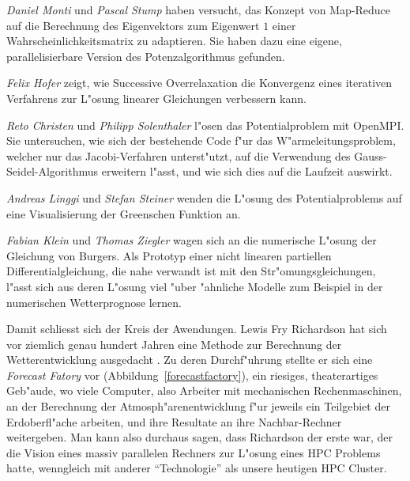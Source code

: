 \begin{refsection}
{\em Daniel Monti} und {\em Pascal Stump} haben versucht, das Konzept
von Map-Reduce auf die Berechnung des Eigenvektors zum Eigenwert $1$
einer Wahrscheinlichkeitsmatrix zu adaptieren. Sie haben dazu eine eigene,
parallelisierbare Version des Potenzalgorithmus gefunden.

{\em Felix Hofer} zeigt, wie Successive Overrelaxation die
Konvergenz eines iterativen Verfahrens zur L"osung linearer Gleichungen
verbessern kann.

{\em Reto Christen} und {\em Philipp Solenthaler} l"osen das Potentialproblem
mit OpenMPI. Sie untersuchen, wie sich der bestehende Code f"ur das
W"armeleitungsproblem, welcher nur das Jacobi-Verfahren unterst"utzt,
auf die Verwendung des Gauss-Seidel-Algorithmus erweitern l"asst, und
wie sich dies auf die Laufzeit auswirkt.

{\em Andreas Linggi} und {\em Stefan Steiner} wenden die L"osung des
Potentialproblems auf eine Visualisierung der Greenschen Funktion an.

{\em Fabian Klein} und {\em Thomas Ziegler} wagen sich an die numerische
L"osung der Gleichung von Burgers. Als Prototyp einer nicht linearen
partiellen Differentialgleichung, die nahe verwandt ist mit den
Str"omungsgleichungen, l"asst sich aus deren L"osung viel "uber "ahnliche
Modelle zum Beispiel in der numerischen Wetterprognose lernen.

Damit schliesst sich der Kreis der Awendungen. Lewis Fry Richardson hat
sich vor ziemlich genau hundert Jahren eine Methode zur Berechnung der
Wetterentwicklung ausgedacht \cite{skript:richardson}.
Zu deren Durchf"uhrung stellte er sich
eine {\em Forecast Fatory} vor (Abbildung~\ref{forecastfactory}),
ein riesiges, theaterartiges Geb"aude,
wo viele Computer, also Arbeiter mit mechanischen Rechenmaschinen, an der
Berechnung der Atmosph"arenentwicklung f"ur jeweils ein Teilgebiet
der Erdoberfl"ache arbeiten,
und ihre Resultate an ihre Nachbar-Rechner weitergeben. 
Man kann also durchaus sagen, dass Richardson der erste war, der die Vision
eines massiv parallelen Rechners zur L"osung eines HPC Problems hatte,
wenngleich mit anderer ``Technologie'' als unsere heutigen HPC Cluster.


\end{refsection}

